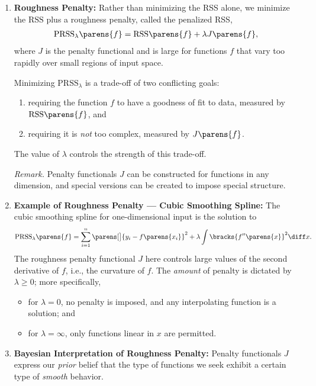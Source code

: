 \documentclass[12pt]{article}
\begin{document}
\begin{enumerate}[label=\textbf{\arabic*.}]
	
	\item \textbf{Roughness Penalty:} Rather than minimizing the RSS alone, we minimize the $\text{RSS}$ plus a roughness penalty, called the penalized RSS, 
	\begin{align}\label{eq-prss}
		\mathrm{PRSS}_{\lambda} \parens{f} = \mathrm{RSS} \parens{f} + \lambda J \parens{f}, 
	\end{align} 
	where $J$ is the penalty functional and is large for functions $f$ that vary too rapidly over small regions of input space. 
	
	Minimizing $\mathrm{PRSS}_{\lambda}$ is a trade-off of two conflicting goals: 
	\begin{enumerate}
		\item requiring the function $f$ to have a goodness of fit to data, measured by $\mathrm{RSS} \parens{f}$, and 
		\item requiring it is \emph{not} too complex, measured by $J \parens{f}$. 
	\end{enumerate}	
	The value of $\lambda$ controls the strength of this trade-off. 
	
	\textit{Remark.} Penalty functionals $J$ can be constructed for functions in any dimension, and special versions can be created to impose special structure. 
	
	\item \textbf{Example of Roughness Penalty --- Cubic Smoothing Spline:} The cubic smoothing spline for one-dimensional input is the solution to 
	\begin{align}
		\mathrm{PRSS}_{\lambda} \parens{f} = \sum_{i=1}^n \parens[\big]{y_i - f \parens{x_i}}^2 + \lambda \int \bracks{f'' \parens{x}}^2 \diff x. 
	\end{align}
	The roughness penalty functional $J$ here controls large values of the second derivative of $f$, i.e., the curvature of $f$. The \emph{amount} of penalty is dictated by $\lambda \ge 0$; more specifically, 
	\begin{itemize}
		\item for $\lambda = 0$, no penalty is imposed, and any interpolating function is a solution; and 
		\item for $\lambda = \infty$, only functions linear in $x$ are permitted. 
	\end{itemize}
	
	\item \textbf{Bayesian Interpretation of Roughness Penalty:} Penalty functionals $J$ express our \textit{prior} belief that the type of functions we seek exhibit a certain type of \emph{smooth} behavior. 
	

\end{enumerate}
\end{document}
